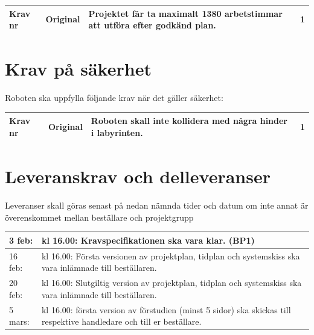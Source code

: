\documentclass[11pt]{article}
\newcounter{kravc}
\newcommand{\kravcc}{
	\thekravc
	\stepcounter{kravc}
}
\begin{document}
\begin{flushleft}
\begin{center}
\begin{longtable}{|l|l|p{.70\linewidth}|l|} \hline

Krav nr\kravcc &
Original &
Projektet får ta maximalt 1380 arbetstimmar att utföra efter godkänd plan. &
1 \\ \hline
\end{longtable}
\end{center}

\section{Krav på säkerhet}
Roboten ska uppfylla följande krav när det gäller säkerhet:

\begin{center}
\begin{longtable}{|l|l|p{.70\linewidth}|l|} \hline

Krav nr\kravcc &
Original &
Roboten skall inte kollidera med några hinder i labyrinten. &
1 \\ \hline

\end{longtable}
\end{center}

\pagebreak
\section{Leveranskrav och delleveranser}
Leveranser skall göras senast på nedan nämnda tider och datum om inte annat är överenskommet mellan beställare och projektgrupp
\begin{center}
\begin{longtable}{|l |p{.8\linewidth}|} \hline

3 feb: & 
kl 16.00: Kravspecifikationen ska vara klar. (BP1) \\ \hline

16 feb: & 
kl 16.00: Första versionen av projektplan, tidplan och systemskiss ska vara inlämnade till beställaren. \\ \hline

20 feb: & 
kl 16.00: Slutgiltig version av projektplan, tidplan och systemskiss ska vara inlämnade till beställaren. \\ \hline

5 mars: &
kl 16.00: första version av förstudien (minst 5 sidor) ska skickas till respektive handledare och till er beställare. \\ \hline


\end{longtable}
\end{center}
\end{flushleft}
\end{document}
